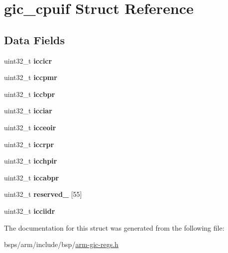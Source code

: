\hypertarget{structgic__cpuif}{}\section{gic\+\_\+cpuif Struct Reference}
\label{structgic__cpuif}
\subsection*{Data Fields}
\begin{DoxyCompactItemize}
\item 
\mbox{\label{structgic__cpuif_a81a0deacfa08471b5956d828830a13d2}} 
uint32\+\_\+t {\bfseries iccicr}
\item 
\mbox{\label{structgic__cpuif_aef52c984a22c1d8c2f73a76580c224a9}} 
uint32\+\_\+t {\bfseries iccpmr}
\item 
\mbox{\label{structgic__cpuif_ad59cf67b3cb0ed096b927937614e2667}} 
uint32\+\_\+t {\bfseries iccbpr}
\item 
\mbox{\label{structgic__cpuif_a34ff011872266aca93c95e54bf64b94f}} 
uint32\+\_\+t {\bfseries icciar}
\item 
\mbox{\label{structgic__cpuif_a0c9405ad332a9d524f86a35ebce59bad}} 
uint32\+\_\+t {\bfseries icceoir}
\item 
\mbox{\label{structgic__cpuif_a6d6e545d40864171347597e0ad808ce4}} 
uint32\+\_\+t {\bfseries iccrpr}
\item 
\mbox{\label{structgic__cpuif_ad9df82165894d84642b1445ba91217a9}} 
uint32\+\_\+t {\bfseries icchpir}
\item 
\mbox{\label{structgic__cpuif_a102823e30698dedc3ebcaf59be42a336}} 
uint32\+\_\+t {\bfseries iccabpr}
\item 
\mbox{\label{structgic__cpuif_a5f854665c9db6591c811143db8dfb19e}} 
uint32\+\_\+t {\bfseries reserved\+\_} \mbox{[}55\mbox{]}
\item 
\mbox{\label{structgic__cpuif_a1f86d9c908f71ed725ad2e7ccf9c0dc4}} 
uint32\+\_\+t {\bfseries icciidr}
\end{DoxyCompactItemize}


The documentation for this struct was generated from the following file\+:\begin{DoxyCompactItemize}
\item 
bsps/arm/include/bsp/\mbox{\hyperlink{arm-gic-regs_8h}{arm-\/gic-\/regs.\+h}}\end{DoxyCompactItemize}
